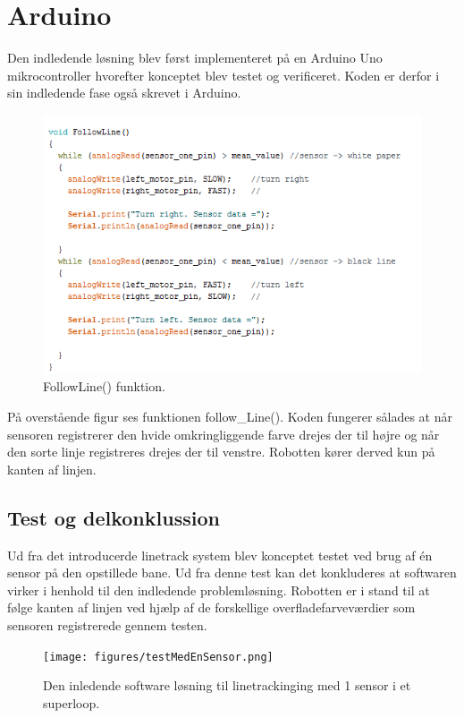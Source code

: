\section{Arduino}
Den indledende løsning blev først implementeret på en Arduino Uno mikrocontroller hvorefter konceptet blev testet og verificeret. Koden er derfor i sin indledende fase også skrevet i Arduino.

\begin{figure}[h!]
  \centering
  \includegraphics[width=1.0\textwidth]{figures/followLine2.png}
  \caption{FollowLine() funktion.}
  \label{follow_line_kode}
\end{figure}

På overstående figur ses funktionen follow\_Line(). Koden fungerer sålades at når sensoren registrerer den hvide omkringliggende farve drejes der til højre og når den sorte linje registreres drejes der til venstre. Robotten kører derved kun på kanten af linjen. 

\subsection{Test og delkonklussion}
Ud fra det introducerde linetrack system blev konceptet testet ved brug af én sensor på den opstillede bane. 
\newline
Ud fra denne test kan det konkluderes at softwaren virker i henhold til den indledende problemløsning. Robotten er i stand til at følge kanten af linjen ved hjælp af de forskellige overfladefarveværdier som sensoren registrerede gennem testen. 
\newline

\begin{figure}[h!]
  \centering
  \texttt{[image: figures/testMedEnSensor.png]}
  \caption{Den inledende software løsning til linetrackinging med 1 sensor i et superloop.}
  \label{indledende_test}
\end{figure}

